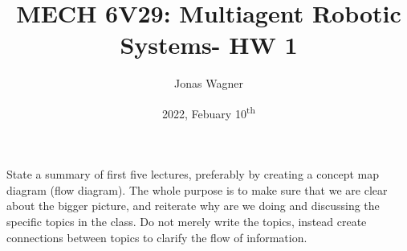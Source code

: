 \documentclass[]{article}
\title{MECH 6V29: Multiagent Robotic Systems- HW 1}
\author{Jonas Wagner}
\date{2022, Febuary 10\textsuperscript{th}}
\numberwithin{equation}{section}
\begin{document}
	

\maketitle

\tableofcontents


\newpage
\section{}
State a summary of first five lectures, preferably by creating a concept map diagram (flow diagram). 
The whole purpose is to make sure that we are clear about the bigger picture, 
and reiterate why are we doing and discussing the specific topics in the class. 
Do not merely write the topics, instead create connections between topics to clarify the flow of information.
\end{document}
